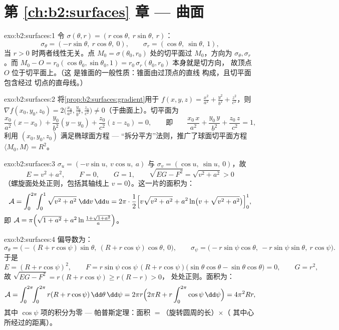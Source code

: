 \section*{第 \ref{ch:b2:surfaces} 章 --- 曲面}

\begin{solution}{exo:b2:surfaces:1}
令 $\sigma(\theta, r) = (r\cos\theta,\ r\sin\theta,\ r)$：
\[
\sigma_\theta = (-r\sin\theta,\ r\cos\theta,\ 0),
\qquad
\sigma_r = (\cos\theta,\ \sin\theta,\ 1),
\]
当 $r > 0$ 时两者线性无关。点 $M_0 =
\sigma(\theta_0, r_0)$ 处的切平面过 $M_0$，方向为
$\sigma_\theta, \sigma_r$。而 $M_0 - O = r_0(\cos\theta_0,
\sin\theta_0, 1) = r_0\,\sigma_r(\theta_0, r_0)$ 本身就是切方向，
故顶点 $O$ 位于切平面上。（这
是锥面的一般性质：锥面由过顶点的直线
构成，且切平面包含经过
切点的直母线。）
\end{solution}

\begin{solution}{exo:b2:surfaces:2}
将\cref{prop:b2:surfaces:gradient}用于 $f(x,y,z) =
\frac{x^2}{a^2} + \frac{y^2}{b^2} + \frac{z^2}{c^2}$，则 $\nabla
f(x_0,y_0,z_0) = 2\bigl(\frac{x_0}{a^2}, \frac{y_0}{b^2},
\frac{z_0}{c^2}\bigr) \neq 0$（于曲面上）。切平面为
\[
\frac{x_0}{a^2}(x - x_0) + \frac{y_0}{b^2}(y - y_0)
+ \frac{z_0}{c^2}(z - z_0) = 0,
\qquad\text{即}\qquad
\frac{x_0\,x}{a^2} + \frac{y_0\,y}{b^2} + \frac{z_0\,z}{c^2} = 1,
\]
利用 $(x_0, y_0, z_0)$ 满足椭球面方程 ---
“拆分平方”法则，推广了球面切平面方程 $\langle
M_0, M \rangle = R^2$。
\end{solution}

\begin{solution}{exo:b2:surfaces:3}
$\sigma_u = (-v\sin u,\ v\cos u,\ a)$ 与 $\sigma_v = (\cos u,\
\sin u,\ 0)$，故
\[
E = v^2 + a^2, \qquad F = 0, \qquad G = 1,
\qquad
\sqrt{EG - F^2} = \sqrt{v^2 + a^2} > 0
\]
（螺旋面处处正则，包括其轴线上 $v =
0$）。这一片的面积为：
\[
\mathcal{A} = \int_0^{2\pi}\!\!\int_0^1
\sqrt{v^2 + a^2}\;\dd v\,\dd u
= 2\pi\cdot\frac12\Bigl[v\sqrt{v^2 + a^2}
+ a^2\ln\bigl(v + \sqrt{v^2 + a^2}\bigr)\Bigr]_0^1 ,
\]
即 $\mathcal{A} = \pi\Bigl(\sqrt{1 + a^2} +
a^2\ln\frac{1 + \sqrt{1 + a^2}}{a}\Bigr)$。
\end{solution}

\begin{solution}{exo:b2:surfaces:4}
偏导数为：
\[
\sigma_\theta = \bigl(-(R + r\cos\psi)\sin\theta,\
(R + r\cos\psi)\cos\theta,\ 0\bigr),
\qquad
\sigma_\psi = \bigl(-r\sin\psi\cos\theta,\
-r\sin\psi\sin\theta,\ r\cos\psi\bigr).
\]
于是
\[
E = (R + r\cos\psi)^2,
\qquad
F = r\sin\psi\cos\psi\,(R + r\cos\psi)
\bigl(\sin\theta\cos\theta - \sin\theta\cos\theta\bigr) = 0,
\qquad
G = r^2 ,
\]
故 $\sqrt{EG - F^2} = r(R + r\cos\psi) \geq r(R - r) > 0$，
处处正则。面积为：
\[
\mathcal{A}
= \int_0^{2\pi}\!\!\int_0^{2\pi} r(R + r\cos\psi)
\,\dd\theta\,\dd\psi
= 2\pi r \Bigl(2\pi R + r\int_0^{2\pi}\cos\psi\,\dd\psi\Bigr)
= 4\pi^2 R r ,
\]
其中 $\cos\psi$ 项的积分为零 --- 帕普斯定理：面积
$=$（旋转圆周的长）$\times$（
其中心所经过的距离）。
\end{solution}

